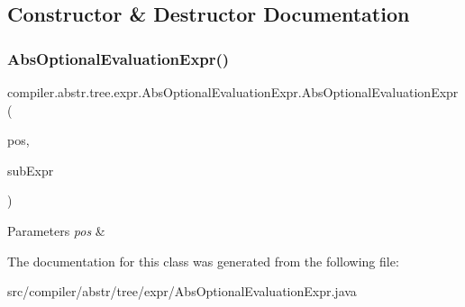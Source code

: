 \subsection{Constructor \& Destructor Documentation}
\mbox{\label{classcompiler_1_1abstr_1_1tree_1_1expr_1_1_abs_optional_evaluation_expr_a6b2fd6d5ff53754473d376af65d79405}} 
\subsubsection{\texorpdfstring{Abs\+Optional\+Evaluation\+Expr()}{AbsOptionalEvaluationExpr()}}
{\footnotesize\ttfamily compiler.\+abstr.\+tree.\+expr.\+Abs\+Optional\+Evaluation\+Expr.\+Abs\+Optional\+Evaluation\+Expr (\begin{DoxyParamCaption}\item[{\hyperlink{classcompiler_1_1_position}{Position}}]{pos,  }\item[{\hyperlink{classcompiler_1_1abstr_1_1tree_1_1expr_1_1_abs_expr}{Abs\+Expr}}]{sub\+Expr }\end{DoxyParamCaption})}


\begin{DoxyParams}{Parameters}
{\em pos} & \\
\hline
\end{DoxyParams}


The documentation for this class was generated from the following file\+:\begin{DoxyCompactItemize}
\item 
src/compiler/abstr/tree/expr/Abs\+Optional\+Evaluation\+Expr.\+java\end{DoxyCompactItemize}
